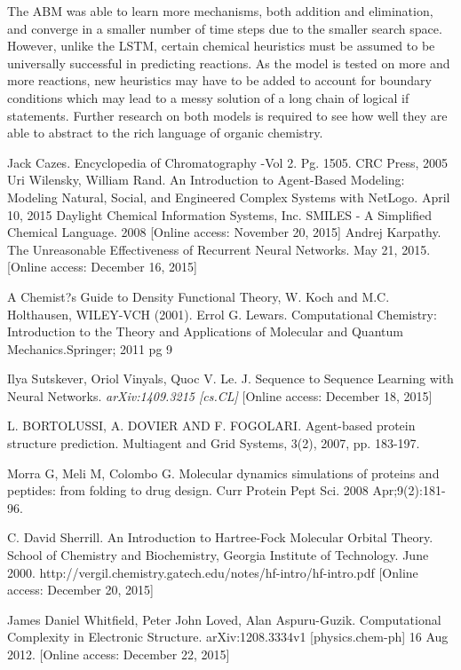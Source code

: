 \documentclass[aps,floatfix,prd,showpacs]{revtex4}
\begin{document}
The ABM was able to learn more mechanisms, both addition and elimination, and converge in a smaller number of time steps due to the smaller search space. However, unlike the LSTM, certain chemical heuristics must be assumed to be universally successful in predicting reactions. As the model is tested on more and more reactions, new heuristics may have to be added to account for boundary conditions which may lead to a messy solution of a long chain of logical if statements. Further research on both models is required to see how well they are able to abstract to the rich language of organic chemistry.


\vspace{500px}

\begin{thebibliography}{99}

Jack Cazes. Encyclopedia of Chromatography -Vol 2. Pg. 1505. CRC Press, 2005
Uri Wilensky, William Rand. An Introduction to Agent-Based Modeling: Modeling Natural, Social, and Engineered Complex Systems with NetLogo. April 10, 2015
Daylight Chemical Information Systems, Inc. SMILES - A Simplified Chemical Language.  2008   [Online access: November 20, 2015] 
Andrej Karpathy. The Unreasonable Effectiveness of Recurrent Neural Networks.  May 21, 2015.  [Online access: December 16, 2015] 


A Chemist?s Guide to Density Functional Theory, W. Koch and M.C. Holthausen, WILEY-VCH (2001).
Errol G. Lewars. Computational Chemistry: Introduction to the Theory and Applications of Molecular and Quantum Mechanics.Springer; 2011 pg 9

Ilya Sutskever, Oriol Vinyals, Quoc V. Le. J. Sequence to Sequence Learning with Neural Networks. {\it arXiv:1409.3215 [cs.CL]} [Online access: December 18, 2015] 

L. BORTOLUSSI, A. DOVIER AND F. FOGOLARI.
Agent-based protein structure prediction.
Multiagent and Grid Systems, 3(2), 2007, pp.
183-197.

Morra G, Meli M, Colombo G. Molecular dynamics simulations of proteins and peptides: from folding to drug design. Curr Protein Pept Sci. 2008 Apr;9(2):181-96.

C. David Sherrill. An Introduction to Hartree-Fock Molecular Orbital Theory. School of Chemistry and Biochemistry, Georgia Institute of Technology. June 2000. http://vergil.chemistry.gatech.edu/notes/hf-intro/hf-intro.pdf [Online access: December 20, 2015]

James Daniel Whitfield, Peter John Loved, Alan Aspuru-Guzik. Computational Complexity in Electronic Structure. arXiv:1208.3334v1 [physics.chem-ph] 16 Aug 2012. [Online access: December 22, 2015]




\end{thebibliography}
\end{document}
